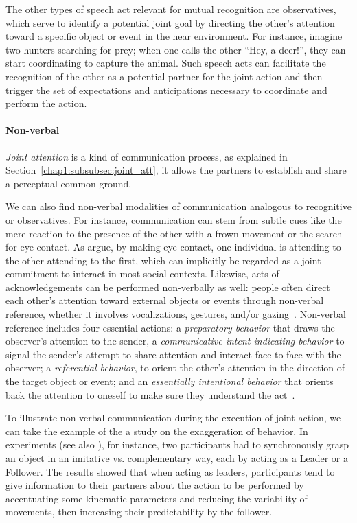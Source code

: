 \documentclass[a4paper,11pt,twoside]{StyleThese}
\begin{document}
The other types of speech act relevant for mutual recognition are observatives, which serve to identify a potential joint goal by directing the other’s attention toward a specific object or event in the near environment. For instance, imagine two hunters searching for prey; when one calls the other ``Hey, a deer!'', they can start coordinating to capture the animal. Such speech acts can facilitate the recognition of the other as a potential partner for the joint action and then trigger the set of expectations and anticipations necessary to coordinate and perform the action.

\paragraph{Non-verbal} \emph{Joint attention} is a kind of communication process, as explained in Section~\ref{chap1:subsubsec:joint_att}, it allows the partners to establish and share a perceptual common ground.

We can also find non-verbal modalities of communication analogous to recognitive or observatives. For instance, communication can stem from subtle cues like the mere reaction to the presence of the other with a frown movement or the search for eye contact. As \cite{brinck_2018_mutual} argue, by making eye contact, one individual is attending to the other attending to the first, which can implicitly be regarded as a joint commitment to interact in most social contexts. Likewise, acts of acknowledgements can be performed non-verbally as well: people often direct each other's attention toward external objects or events through non-verbal reference, whether it involves vocalizations, gestures, and/or gazing~\citep{bates_1979_emergence, leavens_2004_referential, brinck_2008_role}. Non-verbal reference includes four essential actions: a \emph{preparatory behavior} that draws the observer’s attention to the sender, a \emph{communicative-intent indicating behavior} to signal the sender’s attempt to share attention and interact face-to-face with the observer; a \emph{referential behavior}, to orient the other’s attention in the direction of the target object or event; and an \emph{essentially intentional behavior} that orients back the attention to oneself to make sure they understand the act~\cite[p.~122-123]{brinck_2008_role}.

To illustrate non-verbal communication during the execution of joint action, we can take the example of the a study on the exaggeration of behavior. In \cite{sacheli_2013_kinematics} experiments (see also \cite{vesper_2014_strategic}), for instance, two participants had to synchronously grasp an object in an imitative vs. complementary way, each by acting as a Leader or a Follower. The results showed that when acting as leaders, participants tend to give information to their partners about the action to be performed by accentuating some kinematic parameters and reducing the variability of movements, then increasing their predictability by the follower. 
\end{document}
